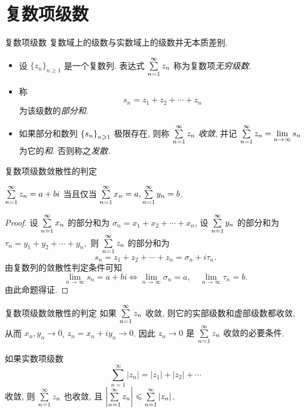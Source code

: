 \section{复数项级数}


\begin{frame}{复数项级数}
\onslide<+->
复数域上的级数与实数域上的级数并无本质差别.
\begin{definition}
\begin{itemize}
\item 设 $\{z_n\}_{n\ge1}$ 是一个复数列.
\onslide<+->
表达式 $\sum\limits_{n=1}^\infty z_n$ 称为复数项\emph{无穷级数}.
\item 称
\[s_n=z_1+z_2+\cdots+z_n\]
为该级数的\emph{部分和}.
\item 如果部分和数列 ${\left\{s_n\right\}}_{n\geqslant 1}$ 极限存在, 则称 $\sum\limits_{n=1}^\infty z_n$ \emph{收敛}, 并记 $\sum\limits_{n=1}^\infty z_n=\lim\limits_{n\to\infty}s_n$ 为它的\emph{和}.
\onslide<+->
否则称之\emph{发散}.
\end{itemize}
\end{definition}
\end{frame}


\begin{frame}{复数项级数敛散性的判定}
\beqskip{8pt}
\begin{theorem}
$\sum\limits_{n=1}^\infty z_n=a+bi$ 当且仅当 $\sum\limits_{n=1}^\infty x_n=a,\sum\limits_{n=1}^\infty y_n=b$.
\end{theorem}
\begin{proof}
设 $\sum\limits_{n=1}^\infty x_n$ 的部分和为 $\sigma_n=x_1+x_2+\cdots+x_n$,
设 $\sum\limits_{n=1}^\infty y_n$ 的部分和为
$\tau_n=y_1+y_2+\cdots+y_n,$
\onslide<+->
则 $\sum\limits_{n=1}^\infty z_n$ 的部分和为
\[s_n=z_1+z_2+\cdots+z_n=\sigma_n+i\tau_n.\]
\onslide<+->
由复数列的敛散性判定条件可知
\[\lim_{n\to\infty}s_n=a+bi\iff	\lim_{n\to\infty}\sigma_n=a,\quad \lim_{n\to\infty}\tau_n=b.\]
\onslide<+->
由此命题得证.
\end{proof}
\endgroup
\end{frame}


\begin{frame}{复数项级数敛散性的判定}
\onslide<+->
如果 $\sum\limits_{n=1}^\infty z_n$ 收敛, 则它的实部级数和虚部级数都收敛,
\onslide<+->
从而 $x_n,y_n\to 0$,
\onslide<+->
$z_n=x_n+iy_n\to 0$.
\onslide<+->
因此 \alert{$z_n\to0$ 是 $\sum\limits_{n=1}^\infty z_n$ 收敛的必要条件}.
\begin{theorem}
如果实数项级数
\[\sum_{n=1}^\infty|z_n|=|z_1|+|z_2|+\cdots\]
收敛, 则 $\sum\limits_{n=1}^\infty z_n$ 也收敛, 且 $\left|\sum\limits_{n=1}^\infty z_n\right|\leqslant\sum\limits_{n=1}^\infty |z_n|$.
\end{theorem}
\end{frame}


